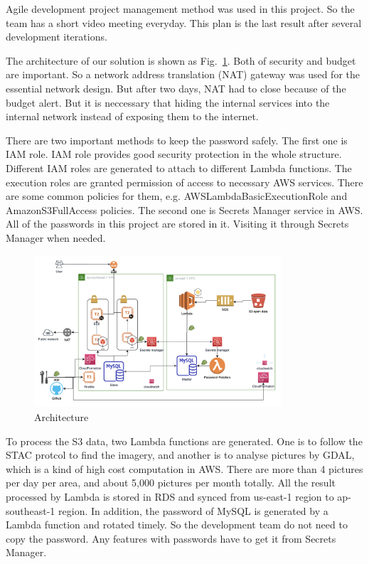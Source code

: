 \documentclass[conference]{IEEEtran}
\begin{document}
Agile development project management method was used in this project. So the team has a short video meeting everyday. This plan is the last 
result after several development iterations.

The architecture of our solution is shown as Fig.~\ref{fig2}. Both of security and budget are important. So a network address translation (NAT) gateway 
was used for the essential network design. But after two days, NAT had to close because of the budget alert. But it is neccessary that hiding the 
internal services into the internal network instead of exposing them to the internet.

There are two important methods to keep the password safely. The first one is IAM role. IAM role provides good security protection in the whole structure.
Different IAM roles are generated to attach to different Lambda functions. The execution roles are granted permission of access to necessary AWS services. 
There are some common policies for them, e.g. AWSLambdaBasicExecutionRole and AmazonS3FullAccess policies. The second one is Secrets Manager service in AWS.
All of the passwords in this project are stored in it. Visiting it through Secrets Manager when needed.


\begin{figure}[htbp]
    \centerline{\includegraphics[width=260pt]{images/arch.png}}
    \caption{Architecture}
    \label{fig2}
\end{figure}
    
To process the S3 data, two Lambda functions are generated. One is to follow the STAC protcol to find the imagery, and another is to analyse pictures by GDAL, 
which is a kind of high cost computation in AWS. There are more than 4 pictures per day per area, and about 5,000 pictures per month totally. All the result processed by 
Lambda is stored in RDS and synced from us-east-1 region to ap-southeast-1 region. In addition, the password of MySQL is generated by a Lambda function and rotated 
timely. So the development team do not need to copy the password. Any features with passwords have to get it from Secrets Manager. 
\end{document}
